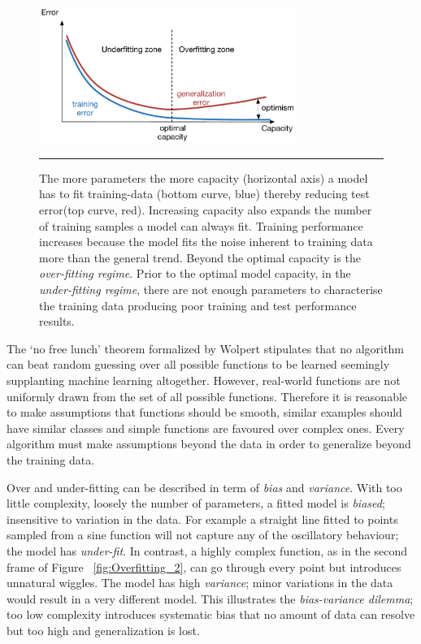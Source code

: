 \begin{figure}[htbp]
	\centering
		\includegraphics[width = 0.75\textwidth]{./Figures/overtraining_DL_textbook_6.jpg}
		\rule{35em}{0.5pt}
	\caption[Optimal Model Capacity]{The more parameters the more capacity (horizontal axis) a model has to fit training-data (bottom curve, blue) thereby reducing test error(top curve, red). Increasing capacity also expands the number of training samples a model can always fit. Training performance increases because the model fits the noise inherent to training data more than the general trend. Beyond the optimal capacity is the \textit{over-fitting regime}. Prior to the optimal model capacity, in the \textit{under-fitting regime}, there are not enough parameters to characterise the training data producing poor training and test performance results.}
	\label{fig:Peaking_effect}
\end{figure}

The `no free lunch' theorem formalized by Wolpert\citep{Wolpert96thelack} stipulates that no algorithm can beat random guessing over all possible functions to be learned seemingly supplanting machine learning altogether. 
However, real-world functions are not uniformly drawn from the set of all possible functions. 
Therefore it is reasonable to make assumptions that functions should be smooth, similar examples should have similar classes and simple functions are favoured over complex ones. 
Every algorithm must make assumptions beyond the data in order to generalize beyond the training data\citep{domingos2012few}.

Over and under-fitting can be described in term of \textit{bias} and \textit{variance}.
With too little complexity, loosely the number of parameters, a fitted model is \textit{biased}; insensitive to variation in the data.
For example a straight line fitted to points sampled from a sine function will not capture any of the oscillatory behaviour; the model has \textit{under-fit}.
In contrast, a highly complex function, as in the second frame of Figure ~\ref{fig:Overfitting_2}, can go through every point but introduces unnatural wiggles.
The model has high \textit{variance}; minor variations in the data would result in a very different model.
This illustrates the \textit{bias-variance dilemma}; too low complexity introduces systematic bias that no amount of data can resolve but too high and generalization is lost.

